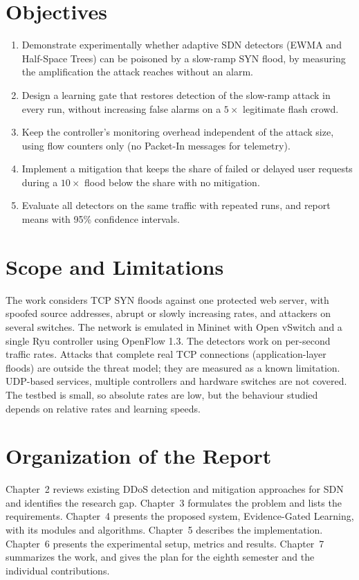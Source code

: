 \documentclass[12pt,a4paper,oneside]{report}
\begin{document}
\section{Objectives}
\begin{enumerate}
\item Demonstrate experimentally whether adaptive SDN detectors (EWMA and Half-Space Trees) can be poisoned by a slow-ramp SYN flood, by measuring the amplification the attack reaches without an alarm.
\item Design a learning gate that restores detection of the slow-ramp attack in every run, without increasing false alarms on a $5\times$ legitimate flash crowd.
\item Keep the controller's monitoring overhead independent of the attack size, using flow counters only (no Packet-In messages for telemetry).
\item Implement a mitigation that keeps the share of failed or delayed user requests during a $10\times$ flood below the share with no mitigation.
\item Evaluate all detectors on the same traffic with repeated runs, and report means with 95\% confidence intervals.
\end{enumerate}

\section{Scope and Limitations}
The work considers TCP SYN floods against one protected web server, with spoofed source addresses, abrupt or slowly increasing rates, and attackers on several switches. The network is emulated in Mininet with Open vSwitch and a single Ryu controller using OpenFlow 1.3. The detectors work on per-second traffic rates. Attacks that complete real TCP connections (application-layer floods) are outside the threat model; they are measured as a known limitation. UDP-based services, multiple controllers and hardware switches are not covered. The testbed is small, so absolute rates are low, but the behaviour studied depends on relative rates and learning speeds.

\section{Organization of the Report}
Chapter~2 reviews existing DDoS detection and mitigation approaches for SDN and identifies the research gap. Chapter~3 formulates the problem and lists the requirements. Chapter~4 presents the proposed system, Evidence-Gated Learning, with its modules and algorithms. Chapter~5 describes the implementation. Chapter~6 presents the experimental setup, metrics and results. Chapter~7 summarizes the work, and gives the plan for the eighth semester and the individual contributions.
\end{document}
